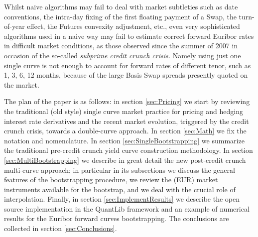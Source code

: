 \documentclass[11pt,reqno]{amsart}
\begin{document}
\par
Whilst naive algorithms may fail to deal with market subtleties such as date conventions, the intra-day fixing of the first floating payment of a Swap, the turn-of-year effect, the Futures convexity adjustment, etc., even very sophisticated algorithms used in a naive way may fail to estimate correct forward Euribor rates in difficult market conditions, as those observed since the summer of 2007 in occasion of the so-called {\it subprime credit crunch crisis.} 
Namely using just one single curve is not enough to account for forward rates of different tenor, such as 1, 3, 6, 12 months, because of the large Basis Swap spreads presently quoted on the market.
\par
The plan of the paper is as follows:
in section \ref{sec:Pricing} we start by reviewing the traditional (old style) single curve market practice for pricing and hedging interest rate derivatives and the recent market evolution, triggered by the credit crunch crisis, towards a double-curve approach.
In section \ref{sec:Math} we fix the notation and nomenclature.
In section \ref{sec:SingleBootstrapping} we summarize the traditional pre-credit crunch yield curve construction methodology.
In section \ref{sec:MultiBootstrapping} we describe in great detail the new post-credit crunch multi-curve approach; in particular in its subsections we discuss the general features of the bootstrapping procedure, we review the (EUR) market instruments available for the bootstrap, and we deal with the crucial role of interpolation.
Finally, in section \ref{sec:ImplementResults} we describe the open source implementation in the QuantLib framework and an example of numerical results for the Euribor forward curves bootstrapping.
The conclusions are collected in section \ref{sec:Conclusions}.
\end{document}
